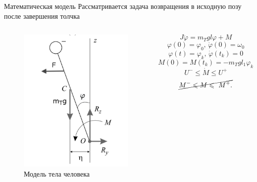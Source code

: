 \documentclass[10pt]{beamer}
\begin{document}
\begin{frame}{Математическая модель}
	Рассматривается задача возвращения в исходную позу после завершения толчка
	\begin{columns}
		\begin{figure}[h!]
			\includegraphics[width=0.55\linewidth]{body_1.pdf}
			\caption{Модель тела человека}
		\end{figure}

		\[
			J\ddot{\varphi}=m_Tgl\varphi+M
		\]
		\[
			\varphi(0)=\varphi_0,\, \dot{\varphi}(0)=\omega_0
		\]
		\[
			\varphi(t)=\varphi_k,\, \dot{\varphi}(t_k)=0
		\]
		\[
			M(0)=M(t_k)=-m_Tgl_1\varphi_k
		\]
		\[
			U^-\leqslant\dot{M}\leqslant U^+
		\]
		\[
			\cancel{M^-\leqslant M\leqslant\ M^+.}
		\]



	\end{columns}
\end{frame}
\end{document}
